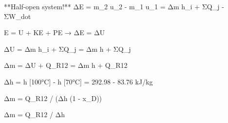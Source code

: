 **Half-open system!**  
ΔE = m_2 u_2 - m_1 u_1 = Δm h_i + ΣQ_j - ΣW_dot  

E = U + KE + PE → ΔE = ΔU  

ΔU = Δm h_i + ΣQ_j = Δm h + ΣQ_j  

Δm = ΔU + Q_R12 = Δm h + Q_R12  

Δh = h [100°C] - h [70°C] = 292.98 - 83.76 kJ/kg  

Δm = Q_R12 / (Δh (1 - x_D))  

Δm = Q_R12 / Δh